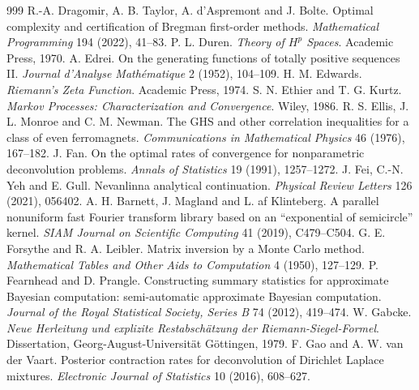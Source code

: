 \begin{thebibliography}{999}
 R.-A. Dragomir, A. B. Taylor, A. d'Aspremont and J. Bolte. Optimal complexity and certification of Bregman first-order methods. \emph{Mathematical Programming} 194 (2022), 41--83.
 P. L. Duren. \emph{Theory of $H^p$ Spaces}. Academic Press, 1970.
 A. Edrei. On the generating functions of totally positive sequences II. \emph{Journal d'Analyse Math\'ematique} 2 (1952), 104--109.
 H. M. Edwards. \emph{Riemann's Zeta Function}. Academic Press, 1974.
 S. N. Ethier and T. G. Kurtz. \emph{Markov Processes: Characterization and Convergence}. Wiley, 1986.
 R. S. Ellis, J. L. Monroe and C. M. Newman. The GHS and other correlation inequalities for a class of even ferromagnets. \emph{Communications in Mathematical Physics} 46 (1976), 167--182.
 J. Fan. On the optimal rates of convergence for nonparametric deconvolution problems. \emph{Annals of Statistics} 19 (1991), 1257--1272.
 J. Fei, C.-N. Yeh and E. Gull. Nevanlinna analytical continuation. \emph{Physical Review Letters} 126 (2021), 056402.
 A. H. Barnett, J. Magland and L. af Klinteberg. A parallel nonuniform fast Fourier transform library based on an ``exponential of semicircle'' kernel. \emph{SIAM Journal on Scientific Computing} 41 (2019), C479--C504.
 G. E. Forsythe and R. A. Leibler. Matrix inversion by a Monte Carlo method. \emph{Mathematical Tables and Other Aids to Computation} 4 (1950), 127--129.
 P. Fearnhead and D. Prangle. Constructing summary statistics for approximate Bayesian computation: semi-automatic approximate Bayesian computation. \emph{Journal of the Royal Statistical Society, Series B} 74 (2012), 419--474.
 W. Gabcke. \emph{Neue Herleitung und explizite Restabsch\"atzung der Riemann-Siegel-Formel}. Dissertation, Georg-August-Universit\"at G\"ottingen, 1979.
 F. Gao and A. W. van der Vaart. Posterior contraction rates for deconvolution of Dirichlet Laplace mixtures. \emph{Electronic Journal of Statistics} 10 (2016), 608--627.

\end{thebibliography}
